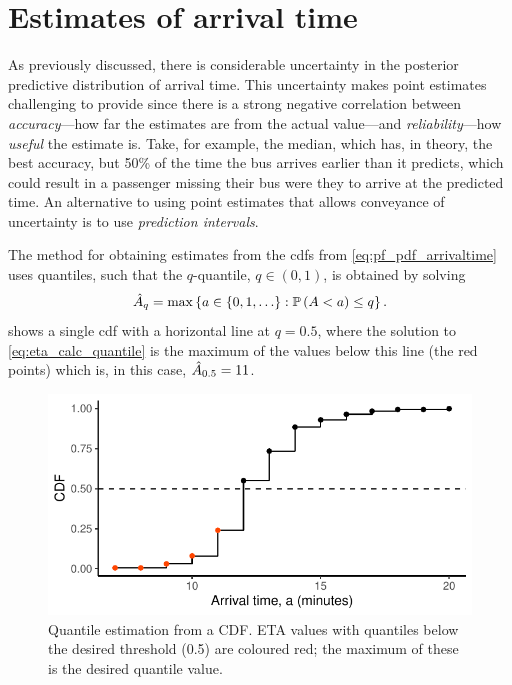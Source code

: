 \section{Estimates of arrival time}
\label{sec:eta_estimates}

As previously discussed, there is considerable uncertainty in the posterior predictive distribution of arrival time. This uncertainty makes point estimates challenging to provide since there is a strong negative correlation between \emph{accuracy}---how far the estimates are from the actual value---and \emph{reliability}---how \emph{useful} the estimate is. Take, for example, the median, which has, in theory, the best accuracy, but 50\% of the time the bus arrives earlier than it predicts, which could result in a passenger missing their bus were they to arrive at the predicted time. An alternative to using point estimates that allows conveyance of uncertainty is to use \emph{prediction intervals}.

The method for obtaining estimates from the \glspl{cdf} from \cref{eq:pf_pdf_arrivaltime} uses quantiles, such that the $q$-quantile, $q\in(0,1)$, is obtained by solving
\begin{equation}
\label{eq:eta_calc_quantile}
\hat{A}_q = \max\left\{a \in \{0, 1, \ldots\} : \mathbb{P}\left(A < a\right) \leq q\right\}.
\end{equation}
 shows a single \gls{cdf} with a horizontal line at $q = 0.5$, where the solution to \cref{eq:eta_calc_quantile} is the maximum of the values below this line (the red points) which is, in this case, $\hat{A}_{0.5} = 11$.


\begin{knitrout}\small
{}\color{fgcolor}\begin{figure}

{\centering \includegraphics[width=.6\textwidth]{figure/eta_calc_quantile-1} 

}

\caption[Quantile estimation from a CDF]{Quantile estimation from a CDF. ETA values with quantiles below the desired threshold (0.5) are coloured red; the maximum of these is the desired quantile value.}\label{fig:eta_calc_quantile}
\end{figure}


\end{knitrout}




